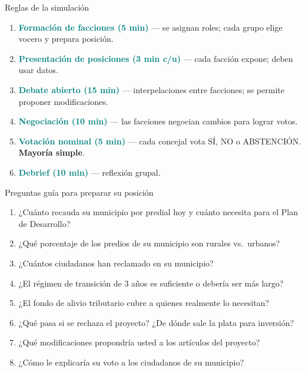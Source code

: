 \documentclass[aspectratio=169]{beamer}
\begin{document}
\begin{frame}{Reglas de la simulación}
  \small
  \begin{enumerate}\itemsep3pt
    \item \textbf{\textcolor{teal}{Formación de facciones (5 min)}}
    --- se asignan roles; cada grupo elige vocero y prepara posición.

    \item \textbf{\textcolor{teal}{Presentación de posiciones (3 min
    c/u)}} --- cada facción expone; deben usar datos.

    \item \textbf{\textcolor{teal}{Debate abierto (15 min)}} ---
    interpelaciones entre facciones; se permite proponer modificaciones.

    \item \textbf{\textcolor{teal}{Negociación (10 min)}} --- las
    facciones negocian cambios para lograr votos.

    \item \textbf{\textcolor{teal}{Votación nominal (5 min)}} --- cada
    concejal vota SÍ, NO o ABSTENCIÓN. \textbf{Mayoría simple}.

    \item \textbf{\textcolor{teal}{Debrief (10 min)}} --- reflexión
    grupal.
  \end{enumerate}
\end{frame}

\begin{frame}{Preguntas guía para preparar su posición}
  \scriptsize
  \begin{enumerate}\itemsep2pt
    \item ¿Cuánto recauda su municipio por predial hoy y cuánto necesita
    para el Plan de Desarrollo?
    \item ¿Qué porcentaje de los predios de su municipio son rurales
    vs.\ urbanos?
    \item ¿Cuántos ciudadanos han reclamado en su municipio?
    \item ¿El régimen de transición de 3 años es suficiente o debería
    ser más largo?
    \item ¿El fondo de alivio tributario cubre a quienes realmente lo
    necesitan?
    \item ¿Qué pasa si se rechaza el proyecto? ¿De dónde sale la plata
    para inversión?
    \item ¿Qué modificaciones propondría usted a los artículos del
    proyecto?
    \item ¿Cómo le explicaría su voto a los ciudadanos de su
    municipio?
  \end{enumerate}
\end{frame}
\end{document}
